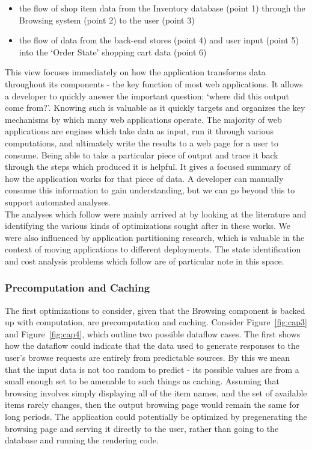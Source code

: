 \documentclass[msc,oneside]{ubcthesis}
\begin{document}
\begin{itemize}
\item the flow of shop item data from the Inventory database (point 1) through the Browsing system (point 2) to the user (point 3)
\item the flow of data from the back-end stores (point 4) and user input (point 5) into the `Order State' shopping cart data (point 6)
\end{itemize}

This view focuses immediately on how the application transforms data throughout its components - the key function of most web applications. It allows a developer to quickly answer the important question: `where did this output come from?'. Knowing such is valuable as it quickly targets and organizes the key mechanisms by which many web applications operate. The majority of web applications are engines which take data as input, run it through various computations, and ultimately write the results to a web page for a user to consume. Being able to take a particular piece of output and trace it back through the steps which produced it is helpful. It gives a focused summary of how the application works for that piece of data. A developer can manually consume this information to gain understanding, but we can go beyond this to support automated analyses. \\

The analyses which follow were mainly arrived at by looking at the literature and identifying the various kinds of optimizations sought after in these works. We were also influenced by application partitioning research, which is valuable in the context of moving applications to different deployments. The state identification and cost analysis problems which follow are of particular note in this space.

\subsubsection{Precomputation and Caching}
The first optimizations to consider, given that the Browsing component is backed up with computation, are precomputation and caching. Consider Figure~\ref{fig:cap3} and Figure~\ref{fig:cap4}, which outline two possible dataflow cases. The first shows how the dataflow could indicate that the data used to generate responses to the user's browse requests are entirely from predictable sources. By this we mean that the input data is not too random to predict - its possible values are from a small enough set to be amenable to such things as caching. Assuming that browsing involves simply displaying all of the item names, and the set of available items rarely changes, then the output browsing page would remain the same for long periods. The application could potentially be optimized by pregenerating the browsing page and serving it directly to the user, rather than going to the database and running the rendering code.\\
\end{document}

